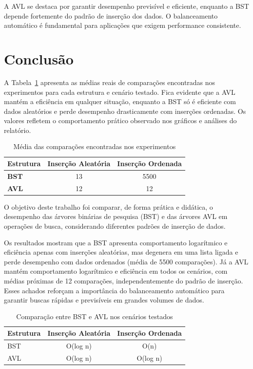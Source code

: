 \documentclass[12pt,a4paper]{article}
\begin{document}
A AVL se destaca por garantir desempenho previsível e eficiente, enquanto a BST depende fortemente do padrão de inserção dos dados. O balanceamento automático é fundamental para aplicações que exigem performance consistente.

\section{Conclusão}



A Tabela~\ref{tab:media_comparacoes} apresenta as médias reais de comparações encontradas nos experimentos para cada estrutura e cenário testado. Fica evidente que a AVL mantém a eficiência em qualquer situação, enquanto a BST só é eficiente com dados aleatórios e perde desempenho drasticamente com inserções ordenadas. Os valores refletem o comportamento prático observado nos gráficos e análises do relatório.

\begin{table}[H]
    \centering
    \caption{Média das comparações encontradas nos experimentos}
    \begin{tabular}{lcc}
        \toprule
        \textbf{Estrutura} & \textbf{Inserção Aleatória} & \textbf{Inserção Ordenada} \\
        \midrule
        \textbf{BST} & 13 & 5500 \\
        \textbf{AVL} & 12 & 12 \\
        \bottomrule
    \end{tabular}
    \label{tab:media_comparacoes}
\end{table}



O objetivo deste trabalho foi comparar, de forma prática e didática, o desempenho das árvores binárias de pesquisa (BST) e das árvores AVL em operações de busca, considerando diferentes padrões de inserção de dados.

Os resultados mostram que a BST apresenta comportamento logarítmico e eficiência apenas com inserções aleatórias, mas degenera em uma lista ligada e perde desempenho com dados ordenados (média de 5500 comparações). Já a AVL mantém comportamento logarítmico e eficiência em todos os cenários, com médias próximas de 12 comparações, independentemente do padrão de inserção. Esses achados reforçam a importância do balanceamento automático para garantir buscas rápidas e previsíveis em grandes volumes de dados.

\begin{table}[H]
    \centering
    \caption{Comparação entre BST e AVL nos cenários testados}
    \begin{tabular}{lcc}
            \toprule
            \textbf{Estrutura} & \textbf{Inserção Aleatória} & \textbf{Inserção Ordenada}
        \\ \midrule
        BST & O(log n) & O(n)
        \\ AVL & O(log n) & O(log n)
        \\ \bottomrule
    \end{tabular}
    \label{tab:comparacao_bst_avl}
\end{table}
\end{document}
